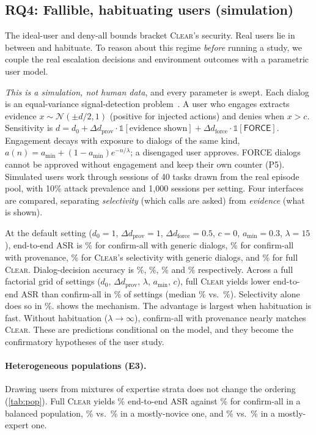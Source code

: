 \documentclass[preprint,12pt,nonatbib]{elsarticle}
\theoremstyle{remark}
\newcommand{\clear}{\textsc{Clear}}
\newcommand{\tier}[1]{\textsf{#1}}
\begin{document}
\subsection{RQ4: Fallible, habituating users (simulation)}
\label{sec:human}
The ideal-user and deny-all bounds bracket \clear{}'s security. Real users lie
in between and habituate. To reason about this regime \emph{before} running a
study, we couple the real escalation decisions and environment outcomes with a
parametric user model.

\emph{This is a simulation, not human data}, and every parameter is swept.
Each dialog is an equal-variance signal-detection
problem~\citep{macmillan2005detection}. A user who engages extracts evidence
$x\sim\mathcal{N}(\pm d/2,1)$ (positive for injected actions) and denies when
$x>c$. Sensitivity is $d=d_0+\Delta d_{\text{prov}}\cdot\mathbb{1}[\text{evidence shown}]+\Delta d_{\text{force}}\cdot\mathbb{1}[\tier{FORCE}]$.
Engagement decays with exposure to dialogs of the same kind,
$a(n)=a_{\min}+(1-a_{\min})e^{-n/\lambda}$; a disengaged user approves.
\tier{FORCE} dialogs cannot be approved without engagement and keep their own
counter (P5). Simulated users work through sessions of 40 tasks drawn from the
real episode pool, with 10\% attack prevalence and 1{,}000 sessions per
setting. Four interfaces are compared, separating \emph{selectivity} (which
calls are asked) from \emph{evidence} (what is shown).

At the default setting ($d_0=1$, $\Delta d_{\text{prov}}=1$,
$\Delta d_{\text{force}}=0.5$, $c=0$, $a_{\min}=0.3$, $\lambda=15$),
end-to-end ASR is \simCall\% for confirm-all with generic dialogs,
\simCallEv\% for confirm-all with provenance, \simClearNoEv\% for \clear{}'s
selectivity with generic dialogs, and \simClear\% for full \clear{}.
Dialog-decision accuracy is \simAccCall\%, \simAccCallEv\%, \simAccClearNoEv\%
and \simAccClear\% respectively. Across a full factorial grid of \simGridN{}
settings ($d_0$, $\Delta d_{\text{prov}}$, $\lambda$, $a_{\min}$, $c$), full
\clear{} yields lower end-to-end ASR than confirm-all in \simShare\% of
settings (median \simMedClear\% vs.\ \simMedCall\%). Selectivity alone does so
in \simShareNoEv\%.  shows the mechanism. The advantage is
largest when habituation is fast. Without habituation ($\lambda\to\infty$),
confirm-all with provenance nearly matches \clear{}. These are predictions
conditional on the model, and they become the confirmatory hypotheses of the
user study.

\paragraph{Heterogeneous populations (E3).} Drawing users from mixtures of
expertise strata does not change the ordering (\cref{tab:pop}). Full \clear{}
yields \popBalClear\% end-to-end ASR against \popBalCall\% for confirm-all in a
balanced population, \popNovClear\% vs.\ \popNovCall\% in a mostly-novice one,
and \popExpClear\% vs.\ \popExpCall\% in a mostly-expert one.
\end{document}
